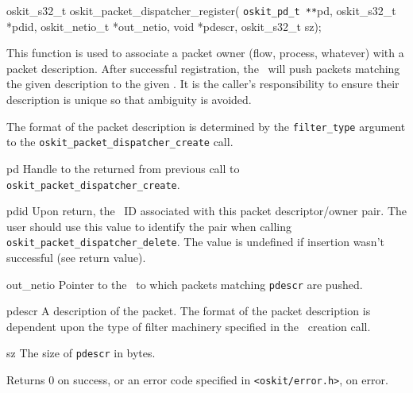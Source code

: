 %
%	

\begin{apisyn}

	\funcproto oskit_s32_t oskit_packet_dispatcher_register(
	{\tt oskit_pd_t **}pd, 
	oskit_s32_t *pdid,
	oskit_netio_t *out_netio,
	void *pdescr,
	oskit_s32_t sz);
\end{apisyn}
\begin{apidesc}
	This function is used to associate a packet owner (flow,
	process, whatever) with a packet description. After
	successful registration, the \pd\ will push packets
	matching the given description to the given \netio. It
	is the caller's responsibility to ensure their description
	is unique so that ambiguity is avoided. 

	The format of the packet description is determined by
	the {\tt filter_type} argument to the 
	{\tt oskit_packet_dispatcher_create} call. 
\end{apidesc}
\begin{apiparm}
	\item[pd]
		Handle to the \pd returned from previous
		call to {\tt oskit_packet_dispatcher_create}. 
	\item[pdid]
		Upon return, the \pd\ ID associated with this packet
		descriptor/owner pair. The user should use this
		value to identify the pair when calling
		{\tt oskit_packet_dispatcher_delete}. The value
		is undefined if insertion wasn't successful (see
		return value). 
	\item[out_netio]
		Pointer to the \netio\ to which packets
		matching {\tt pdescr} are pushed.
	\item[pdescr]
		A description of the packet. The format of
		the packet description is dependent upon
		the type of filter machinery specified in the
		\pd\ creation call. 
	\item[sz]
		The size of {\tt pdescr} in bytes. 
\end{apiparm}
\begin{apiret}
	Returns 0 on success, or an error code specified in
	{\tt <oskit/error.h>}, on error.
\end{apiret}

%
%	

